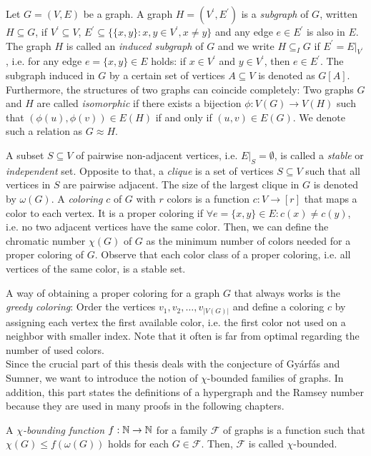 Let $G=(V,E)$ be a graph. A graph $H=(V^\prime ,E^\prime )$ is a \textit{subgraph} of $G$, written $H\subseteq G$, if $V^\prime\subseteq V$, $E^\prime\subseteq \lbrace \lbrace x,y\rbrace : x,y\in V^\prime, x\neq y\rbrace$ and any edge $e\in E^\prime$ is also in $E$. The graph $H$ is called an \textit{induced subgraph} of $G$ and we write $H\subseteq_I G$ if $E^\prime = E\vert_{V^\prime}$, i.e. for any edge $e=\lbrace x,y\rbrace\in E$ holds: if $x\in V^\prime$ and $y\in V^\prime$, then $e\in E^\prime$. The subgraph induced in $G$ by a certain set of vertices $A\subseteq V$ is denoted as $G[A]$. Furthermore, the structures of two graphs can coincide completely: Two graphs $G$ and $H$ are called \textit{isomorphic} if there exists a bijection $\phi :V(G)\to V(H)$ such that $(\phi (u), \phi (v))\in E(H)$ if and only if $(u, v)\in E(G)$. We denote such a relation as $G\approx H$.

A subset $S\subseteq V$ of pairwise non-adjacent vertices, i.e. $E\vert_S =\emptyset$, is called a \textit{stable} or \textit{independent} set. Opposite to that, a \textit{clique} is a set of vertices $S\subseteq V$ such that all vertices in $S$ are pairwise adjacent. The size of the largest clique in $G$ is denoted by $\omega (G)$. A \textit{coloring} $c$ of $G$ with $r$ colors is a function $c:V\to [r]$ that maps a color to each vertex. It is a proper coloring if $\forall e = \lbrace x,y\rbrace\in E: c(x)\neq c(y)$, i.e. no two adjacent vertices have the same color. Then, we can define the chromatic number $\chi (G)$ of $G$ as the minimum number of colors needed for a proper coloring of $G$. Observe that each color class of a proper coloring, i.e. all vertices of the same color, is a stable set.

A way of obtaining a proper coloring for a graph $G$ that always works is the \textit{greedy coloring}: Order the vertices $v_1, v_2, \dots ,v_{\vert V(G) \vert }$ and define a coloring $c$ by assigning each vertex the first available color, i.e. the first color not used on a neighbor with smaller index. Note that it often is far from optimal regarding the number of used colors.
\\[2ex]
Since the crucial part of this thesis deals with the conjecture of Gyárfás and Sumner, we want to introduce the notion of $\chi$-bounded families of graphs. In addition, this part states the definitions of a hypergraph and the Ramsey number because they are used in many proofs in the following chapters.

\begin{defn}\label{d1}
A $\chi$\textit{-bounding function} $f:\mathbb{N}\to\mathbb{N}$ for a family $\mathcal{F}$ of graphs is a function such that $\chi (G)\leq f(\omega (G))$ holds for each $G\in\mathcal{F}$. Then, $\mathcal{F}$ is called $\chi$-bounded.
\end{defn}

